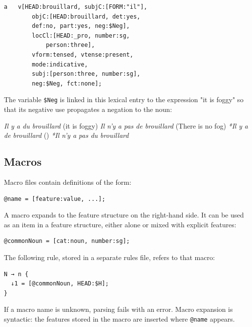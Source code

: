 \documentclass[11pt]{article}
\begin{document}
\begin{itemize}
	      \begin{lstlisting}[numbers=none]
a	v[HEAD:brouillard, subjC:[FORM:"il"], 
		objC:[HEAD:brouillard, det:yes, 
		def:no, part:yes, neg:$Neg], 
		locCl:[HEAD:_pro, number:sg, 
			person:three], 
		vform:tensed, vtense:present, 
		mode:indicative, 
		subj:[person:three, number:sg], 
		neg:$Neg, fct:none];
\end{lstlisting}

	      The variable \verb#$Neg# is linked in this lexical entry to the expression "it is foggy"
	      so that its negative use propagates a negation to the noun:

	      \begin{exe}
		      \ex \begin{xlist}
			      \ex \textit{Il y a du brouillard} (it is foggy)
			      \ex \textit{Il n'y a pas de brouillard} (There is no fog)
			      \ex \textit{*Il y a de brouillard} ()
			      \ex \textit{*Il n'y a pas du brouillard}
		      \end{xlist}
	      \end{exe}

\end{itemize}


\subsection{Macros}

Macro files contain definitions of the form:

\begin{lstlisting}[numbers=none]
@name = [feature:value, ...];
\end{lstlisting}

A macro expands to the feature structure on the right-hand side.  It can be
used as an item in a feature structure, either alone or mixed with explicit
features:

\begin{lstlisting}[numbers=none]
@commonNoun = [cat:noun, number:sg];
\end{lstlisting}

The following rule, stored in a separate rules file, refers to that macro:

\begin{lstlisting}[numbers=none]
N → n {
  ↓1 = [@commonNoun, HEAD:$H];
}
\end{lstlisting}

If a macro name is unknown, parsing fails with an error.  Macro expansion is
syntactic: the features stored in the macro are inserted where \verb#@name#
appears.
\end{document}
